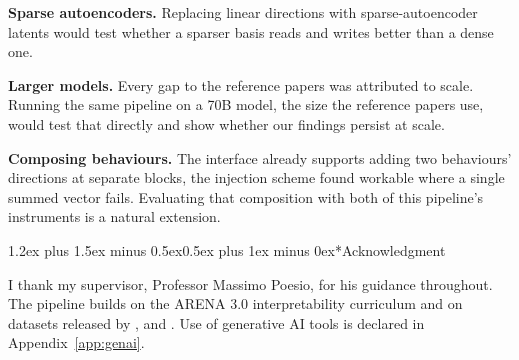 \documentclass[conference]{IEEEtran}
\makeatletter
\renewcommand{\section}{\@startsection{section}{1}{\z@}%
  {1.2ex plus 1.5ex minus 0.5ex}{0.5ex plus 1ex minus 0ex}{\normalfont\normalsize\centering\scshape}}
\makeatother
\begin{document}
\textbf{Sparse autoencoders.} Replacing linear directions with
sparse-autoencoder latents \citep{cunningham2023,bricken2023} would test
whether a sparser basis reads and writes better than a dense one.

\textbf{Larger models.} Every gap to the reference papers was attributed
to scale. Running the same pipeline on a 70B model, the size the reference papers
use, would test that directly and show whether our findings persist
at scale.

\textbf{Composing behaviours.} The interface already supports adding two behaviours'
directions at separate blocks, the injection scheme \citet{vanderweij2024}
found workable where a single summed vector fails. Evaluating that
composition with both of this pipeline's instruments is a natural
extension.

\section*{Acknowledgment}

I thank my supervisor, Professor Massimo Poesio, for his guidance
throughout. The pipeline builds on
the ARENA 3.0 interpretability curriculum \citep{arena2024} and on datasets
released by \citet{goldowsky2025}, \citet{mckenzie2025} and \citet{cincynlp2025}.
Use of generative AI tools is declared in Appendix~\ref{app:genai}.
\end{document}
